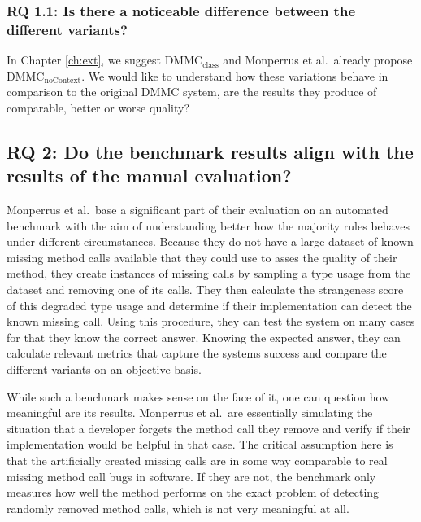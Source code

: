 \subsubsection{RQ 1.1: Is there a noticeable difference between the different variants?}

In Chapter \ref{ch:ext}, we suggest $\text{DMMC}_\text{class}$ and Monperrus et al.\ already propose $\text{DMMC}_\text{noContext}$.
We would like to understand how these variations behave in comparison to the original $\text{DMMC}$ system, are the results they produce of comparable, better or worse quality?

\subsection{RQ 2: Do the benchmark results align with the results of the manual evaluation?}

Monperrus et al.\ base a significant part of their evaluation on an automated benchmark with the aim of understanding better how the majority rules behaves under different circumstances.
Because they do not have a large dataset of known missing method calls available that they could use to asses the quality of their method, they create instances of missing calls by sampling a type usage from the dataset and removing one of its calls.
They then calculate the strangeness score of this degraded type usage and determine if their implementation can detect the known missing call.
Using this procedure, they can test the system on many cases for that they know the correct answer.
Knowing the expected answer, they can calculate relevant metrics that capture the systems success and compare the different variants on an objective basis.

While such a benchmark makes sense on the face of it, one can question how meaningful are its results.
Monperrus et al.\ are essentially simulating the situation that a developer forgets the method call they remove and verify if their implementation would be helpful in that case.
The critical assumption here is that the artificially created missing calls are in some way comparable to real missing method call bugs in software.
If they are not, the benchmark only measures how well the method performs on the exact problem of detecting randomly removed method calls, which is not very meaningful at all.

